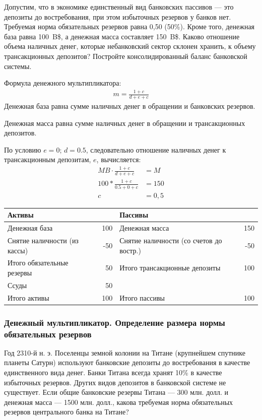 \documentclass[12pt, table, a4paper,twoside]{exam}
\begin{document}
\begin{questions}
\question[10] Допустим, что в экономике единственный вид банковских пассивов — это депозиты до востребования, при этом избыточных резервов у банков нет. Требуемая норма обязательных резервов равна 0,50 (50\%). Кроме того, денежная база равна 100~B\$, а денежная масса составляет 150~B\$. Каково отношение объема наличных денег, которые небанковский сектор склонен хранить, к объему трансакционных депозитов? Постройте консолидированный баланс банковской системы.

\begin{solution}[12em]
	
	Формула денежного мультипликатора:
	\begin{align*}
	m = \frac{1 + c}{d + e + c}
	\end{align*}
	Денежная база равна сумме наличных денег в обращении и банковских резервов.
	
	Денежная масса равна сумме наличных денег в обращении и трансакционных депозитов.
	
	По условию $e = 0$; $d = 0.5$, следовательно отношение наличных денег к трансакционным депозитам, $e$,  вычисляется:
	\begin{align}
	MB \cdot \frac{1 + c}{d + e + c} &= M\\
	100 * \frac{1 + c}{0.5 + 0 + c} &= 150\nonumber\\
	c &= 0,5\nonumber
	\end{align}
	\begin{tabularx}{\linewidth}[b]{@{}>{\raggedright\arraybackslash}XrXr@{}}
		\toprule
			Активы &       & Пассивы &  \\
			\midrule
			Денежная база & 100   & Денежная масса & 150 \\
			\midrule
			Снятие наличности (из кассы) & -50   & Снятие наличности (со счетов до востр.) & -50 \\
			Итого обязательные резервы & 50    & Итого трансакционные депозиты & 100 \\
			Ссуды & 50    &       &  \\
			\midrule
			Итого активы & 100   & Итого пассивы & 100 \\
			\bottomrule
		\end{tabularx}%
\end{solution}


\subsubsection{Денежный мультипликатор. Определение размера нормы обязательных резервов}
\question[10] Год 2310-й н. э. Поселенцы земной колонии на Титане (крупнейшем спутнике планеты Сатурн) используют банковские депозиты до востребования в качестве единственного вида денег. Банки Титана всегда хранят 10\% в качестве избыточных резервов. Других видов депозитов в банковской системе не существует. Если общие банковские резервы Титана — 300 млн. долл. и денежная масса — 1500 млн. долл., какова требуемая норма обязательных резервов центрального банка на Титане?


\end{questions}
\end{document}
